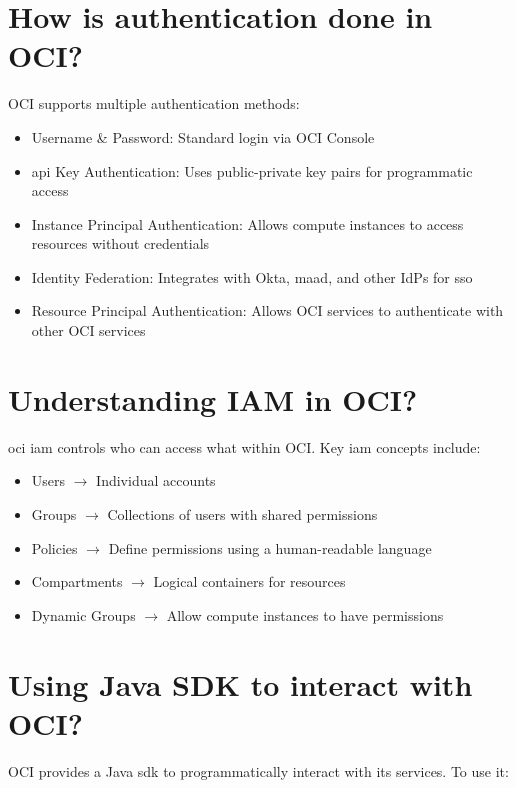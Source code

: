 \documentclass[../main.tex]{subfiles}
\begin{document}
\section{How is authentication done in OCI?}
OCI supports multiple authentication methods:
\begin{itemize}
  \item{Username \& Password: Standard login via OCI Console}
  \item{\acrfull{api} Key Authentication: Uses public-private key pairs for programmatic access}

  \item{Instance Principal Authentication: Allows compute instances to access resources without credentials}

  \item{Identity Federation: Integrates with Okta, \acrfull{maad}, and other \acrfull{IdP}s for \acrfull{sso}}

  \item{Resource Principal Authentication: Allows OCI services to authenticate with other OCI services}
\end{itemize}
\section{Understanding IAM in OCI?}
\acrshort{oci} \acrfull{iam} controls who can access what within OCI. Key \acrshort{iam} concepts include:
\begin{itemize}
  \item Users $\rightarrow$ Individual accounts
  \item Groups $\rightarrow$ Collections of users with shared permissions
  \item Policies $\rightarrow$ Define permissions using a human-readable language
  \item Compartments $\rightarrow$ Logical containers for resources
  \item Dynamic Groups $\rightarrow$ Allow compute instances to have permissions
\end{itemize}

\section{Using Java SDK to interact with OCI?}
OCI provides a Java \acrshort{sdk} to programmatically interact with its services. To use it:
\end{document}
